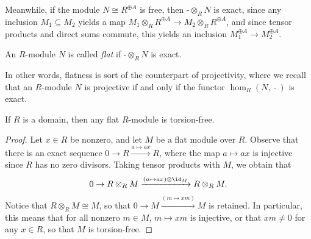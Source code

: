 \documentclass[10pt]{mypackage}
\begin{document}
Meanwhile, if the module $N\cong R^{\oplus A}$ is free, then $\operatorname{-}\otimes_{R}N$ is exact, since any inclusion $M_1\subseteq M_2$ yields a map $M_1\otimes_{R}R^{\oplus A}\rightarrow M_2\otimes_{R}R^{\oplus A}$, and since tensor products and direct sums commute, this yields an inclusion $M_1^{\oplus A}\rightarrow M_2^{\oplus A}$.
\begin{definition}
  An $R$-module $N$ is called \textit{flat} if $\operatorname{-}\otimes_{R}N$ is exact.
\end{definition}
In other words, flatness is sort of the counterpart of projectivity, where we recall that an $R$-module $N$ is projective if and only if the functor $\hom_{R}\left( N,\operatorname{-} \right)$ is exact.
\begin{proposition}
  If $R$ is a domain, then any flat $R$-module is torsion-free.
\end{proposition}
\begin{proof}
  Let $x\in R$ be nonzero, and let $M$ be a flat module over $R$. Observe that there is an exact sequence $0\rightarrow R\xrightarrow{a\mapsto ax} R$, where the map $a\mapsto ax$ is injective since $R$ has no zero divisors. Taking tensor products with $M$, we obtain that
  \begin{align*}
    0 \rightarrow R\otimes_{R}M\xrightarrow{\left( a\mapsto ax \right)\otimes \id_M} R\otimes_{R}M.
  \end{align*}
  Notice that $R\otimes_{R}M\cong M$, so that $0\rightarrow M\xrightarrow{\left( m\mapsto xm \right)}M$ is retained. In particular, this means that for all nonzero $m\in M$, $m\mapsto xm$ is injective, or that $xm\neq 0$ for any $x\in R$, so that $M$ is torsion-free.
\end{proof}
\end{document}
